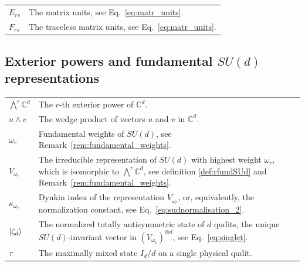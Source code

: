 \documentclass[10pt,twocolumn,superscriptaddress,aps,amsmath,amssymb,citeautoscript,floatfix,prx]{revtex4-2}
\theoremstyle{plain}
\theoremstyle{plain}
\theoremstyle{plain}
\theoremstyle{plain}
\theoremstyle{plain}
\theoremstyle{plain}
\theoremstyle{plain}
\theoremstyle{definition}
\theoremstyle{plain}
\begin{document}
\begin{appendix}
\begin{tabular}{@{}ll@{}}
\parbox[t]{0.22\textwidth}{$E_{rs}$} & \parbox[t]{0.72\textwidth}{The matrix units, see Eq.~\eqref{eq:matr_units}.} \\[0.6em]

\parbox[t]{0.22\textwidth}{$F_{rs}$} & \parbox[t]{0.72\textwidth}{The traceless matrix units, see Eq.~\eqref{eq:matr_units}.} \\[0.6em]

\end{tabular}


\subsection*{Exterior powers and fundamental \(SU(d)\) representations}

\begin{tabular}{@{}ll@{}}

\parbox[t]{0.22\textwidth}{$\bigwedge^r \mathbb{C}^d$} & \parbox[t]{0.72\textwidth}{The $r$-th exterior power of $\mathbb{C}^d$.} \\[0.6em]

\parbox[t]{0.22\textwidth}{$u \wedge v$} & \parbox[t]{0.72\textwidth}{The wedge product of vectors $u$ and $v$ in $\mathbb{C}^d$.} \\[0.6em]

\parbox[t]{0.22\textwidth}{$\omega_r$} & \parbox[t]{0.72\textwidth}{Fundamental weights of $SU(d)$, see Remark~\ref{rem:fundamental_weights}.} \\[0.6em]

\parbox[t]{0.22\textwidth}{$V_{\omega_r}$} & \parbox[t]{0.72\textwidth}{The irreducible representation of $SU(d)$ with highest weight $\omega_r$, which is isomorphic to $\bigwedge^r \mathbb{C}^d$, see definition \ref{def:rfundSUd} and Remark~\ref{rem:fundamental_weights}.} \\[0.6em]

\parbox[t]{0.22\textwidth}{$\kappa_{\omega_r}$} & \parbox[t]{0.72\textwidth}{Dynkin index of the representation $V_{\omega_r}$, or, equivalently, the normalization constant, see Eq.~\eqref{eq:sudnormalisation_2}.} \\[0.6em]

\parbox[t]{0.22\textwidth}{$\ket{\zeta_d}$} & \parbox[t]{0.72\textwidth}{The normalized totally antisymmetric state of $d$ qudits, the unique $SU(d)$-invariant vector in $(V_{\omega_1})^{\otimes d}$, see Eq.~\eqref{eq:singlet}.} \\[0.6em]

\parbox[t]{0.22\textwidth}{$\tau$} & \parbox[t]{0.72\textwidth}{The maximally mixed state $I_d/d$ on a single physical qudit.} \\[0.6em]


\end{tabular}
\end{appendix}
\end{document}
